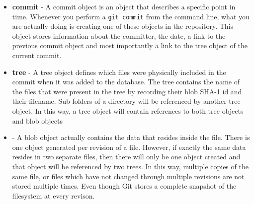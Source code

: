 \begin{itemize}
\item\textbf{commit} - A commit object is an object that describes a specific point in time.  Whenever you perform a \texttt{git commit} from the command line, what you are actually doing is creating one of these objects in the repository.  This object stores information about the committer, the date, a link to the previous commit object and most importantly a link to the tree object of the current commit.
\item\textbf{tree} - A tree object defines which files were physically included in the commit when it was added to the database.  The tree contains the name of the files that were present in the tree by recording their blob SHA-1 id and their filename.  Sub-folders of a directory will be referenced by another tree object.  In this way, a tree object will contain references to both tree objects and blob objects
\item{} - A blob object actually contains the data that resides inside the file.  There is one object generated per revision of a file.  However, if exactly the same data resides in two separate files, then there will only be one object created and that object will be referenced by two trees.  In this way, multiple copies of the same file, or files which have not changed through multiple revisions are not stored multiple times.  Even though Git stores a complete snapshot of the filesystem at every revison.
\end{itemize}

